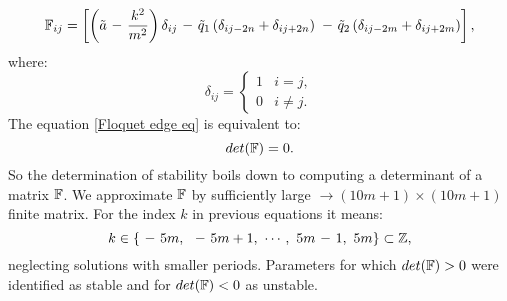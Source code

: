 \begin{equation}
	\tensorq{F}_{i j} = \left[ \left(\tilde{a} \minus \dfrac{k^2}{m^2} \right)\delta_{i j} \minus \tilde{q}_1 \left(\delta_{i j-2n} + \delta_{i j+2n} \right) \minus \tilde{q}_2 \left(\delta_{i j-2m} + \delta_{i j+2m} \right)  \right],
\end{equation} 
where:
\begin{equation}
	\delta_{ij} = 
	\begin{cases}
		1 & i=j, \\
		0 & i \neq j.
	\end{cases}	
\end{equation}
The equation \eqref{Floquet edge eq} is equivalent to:
\begin{equation}
	\label{Floquet determinant}
	det(\mathbb{F}) = 0.
\end{equation}
So the determination of stability boils down to computing a determinant of a matrix $\mathbb{F}$. We approximate $\mathbb{F}$ by sufficiently large $\rightarrow (10m+1) \times (10m+1)$ finite matrix. For the index $k$ in previous equations it means: $$k \in \{ \minus 5m, \ \minus 5m+1, \  \cdots, \ 5m \minus 1, \ 5m \} \subset \Z,$$ neglecting solutions with smaller periods. Parameters for which $det(\mathbb{F}) > 0$ were identified as stable and for $det(\mathbb{F}) < 0$ as unstable.
 	
